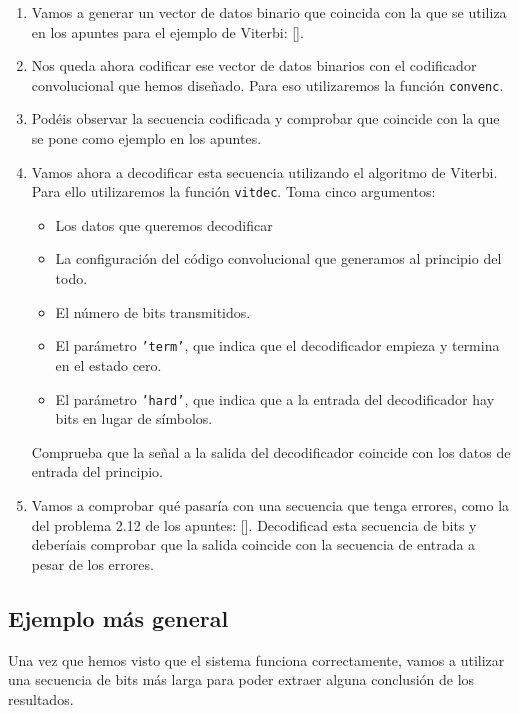 \documentclass[es,practica]{uah}
\begin{document}
\begin{enumerate}
		\item Vamos a generar un vector de datos binario que coincida con la que se utiliza en los apuntes para el ejemplo de Viterbi: [].
		\item Nos queda ahora codificar ese vector de datos binarios con el codificador convolucional que hemos diseñado. Para eso utilizaremos la función \texttt{convenc}.
		\item Podéis observar la secuencia codificada y comprobar que coincide con la que se pone como ejemplo en los apuntes. 
		\item Vamos ahora a decodificar esta secuencia utilizando el algoritmo de Viterbi. Para ello utilizaremos la función \texttt{vitdec}. Toma cinco argumentos:
		\begin{itemize}
			\item Los datos que queremos decodificar
			\item La configuración del código convolucional que generamos al principio del todo.
			\item El número de bits transmitidos.
			\item El parámetro \texttt{'term'}, que indica que el decodificador empieza y termina en el estado cero. 
			\item El parámetro \texttt{'hard'}, que indica que a la entrada del decodificador hay bits en lugar de símbolos. 
		\end{itemize}
		Comprueba que la señal a la salida del decodificador coincide con los datos de entrada del principio. 

		\item Vamos a comprobar qué pasaría con una secuencia que tenga errores, como la del problema 2.12 de los apuntes: []. Decodificad esta secuencia de bits y deberíais comprobar que la salida coincide con la secuencia de entrada a pesar de los errores. 
	\end{enumerate}

\subsection{Ejemplo más general}
	Una vez que hemos visto que el sistema funciona correctamente, vamos a utilizar una secuencia de bits más larga para poder extraer alguna conclusión de los resultados.
\end{document}
